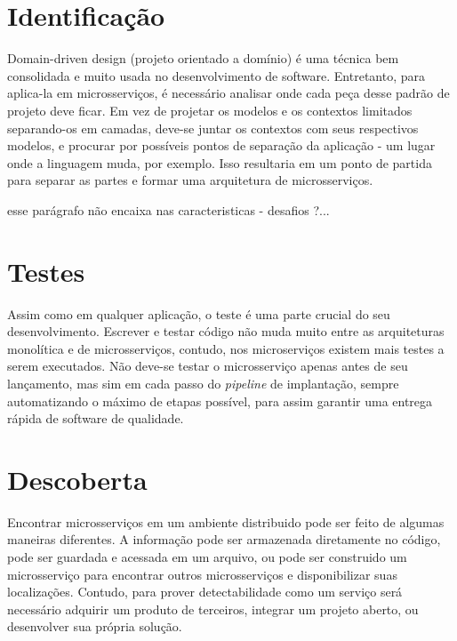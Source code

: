 \section{Identificação}

Domain-driven design (projeto orientado a domínio) é uma técnica bem consolidada e muito usada no desenvolvimento de software. Entretanto, para aplica-la em microsserviços, é necessário analisar onde cada peça desse padrão de projeto deve ficar. Em vez de projetar os modelos e os contextos limitados separando-os em camadas, deve-se juntar os contextos com seus respectivos modelos, e procurar por possíveis pontos de separação da aplicação - um lugar onde a linguagem muda, por exemplo. Isso resultaria em um ponto de partida para separar as partes e formar uma arquitetura de microsserviços. \cite{Familiar2015}

esse parágrafo não encaixa nas caracteristicas - desafios ?...

\section{Testes}

Assim como em qualquer aplicação, o teste é uma parte crucial do seu desenvolvimento. Escrever e testar código não muda muito entre as arquiteturas monolítica e de microsserviços, contudo, nos microserviços existem mais testes a serem executados. Não deve-se testar o microsserviço apenas antes de seu lançamento, mas sim em cada passo do \emph{pipeline} de implantação, sempre automatizando o máximo de etapas possível, para assim garantir uma entrega rápida de software de qualidade. \cite{Familiar2015}

\section{Descoberta}

Encontrar microsserviços em um ambiente distribuido pode ser feito de algumas maneiras diferentes. A informação pode ser armazenada diretamente no código, pode ser guardada e acessada em um arquivo, ou pode ser construido um microsserviço para encontrar outros microsserviços e disponibilizar suas localizações. Contudo, para prover detectabilidade como um serviço será necessário adquirir um produto de terceiros, integrar um projeto aberto, ou desenvolver sua própria solução. \cite{Familiar2015}
